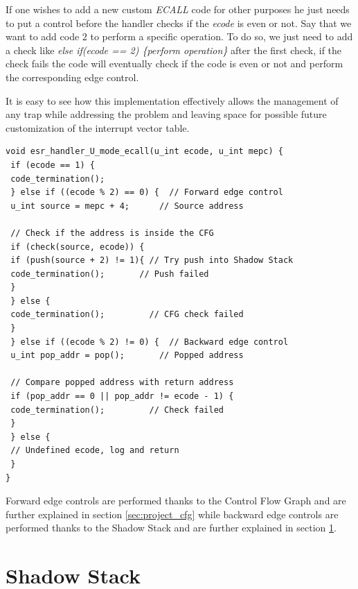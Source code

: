 If one wishes to add a new custom \textit{ECALL} code for other purposes he just
needs to put a control before the handler checks if the \textit{ecode} is even
or not. Say that we want to add code $2$ to perform a specific operation. To do
so, we just need to add a check like \textit{else if(ecode == 2) \{perform operation\}}
after the first check, if the check fails the code will eventually check if the code
is even or not and perform the corresponding edge control.

It is easy to see how this implementation effectively allows the management of any
trap while addressing the problem and leaving space for possible future customization
of the interrupt vector table. \\
\begin{lstlisting}[style=CStyle, caption = U-mode \textit{ECALL} handler, label={lst:ecallhandler}]
void esr_handler_U_mode_ecall(u_int ecode, u_int mepc) {
 if (ecode == 1) {
 code_termination();
 } else if ((ecode % 2) == 0) {  // Forward edge control
 u_int source = mepc + 4;      // Source address

 // Check if the address is inside the CFG
 if (check(source, ecode)) {
 if (push(source + 2) != 1){ // Try push into Shadow Stack
 code_termination();       // Push failed
 }
 } else {
 code_termination();         // CFG check failed
 }
 } else if ((ecode % 2) != 0) {  // Backward edge control
 u_int pop_addr = pop();       // Popped address

 // Compare popped address with return address
 if (pop_addr == 0 || pop_addr != ecode - 1) {
 code_termination();         // Check failed
 }
 } else {
 // Undefined ecode, log and return
 }
}
\end{lstlisting}

Forward edge controls are performed thanks to the Control Flow Graph and are further
explained in section \ref{sec:project_cfg} while backward edge controls are performed
thanks to the Shadow Stack and are further explained in section \ref{sec:project_ss}.

\section{Shadow Stack}
\label{sec:project_ss}

